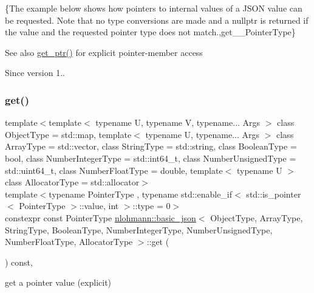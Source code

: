 \{The example below shows how pointers to internal values of a J\+S\+ON value can be requested. Note that no type conversions are made and a {\ttfamily nullptr} is returned if the value and the requested pointer type does not match.,get\+\_\+\+\_\+\+Pointer\+Type\}

\begin{DoxySeeAlso}{See also}
\hyperlink{classnlohmann_1_1basic__json_a7ab11375ed2e29c2fcb6119386851445}{get\+\_\+ptr()} for explicit pointer-\/member access
\end{DoxySeeAlso}
\begin{DoxySince}{Since}
version 1.. 
\end{DoxySince}
\hypertarget{classnlohmann_1_1basic__json_a9008c688b9bd5798e4090c971d20ee92}{}\label{classnlohmann_1_1basic__json_a9008c688b9bd5798e4090c971d20ee92} 
\subsubsection{\texorpdfstring{get()}{get()}\hspace{0.1cm}{\footnotesize\ttfamily [3/3]}}
{\footnotesize\ttfamily template$<$template$<$ typename U, typename V, typename... Args $>$ class Object\+Type = std\+::map, template$<$ typename U, typename... Args $>$ class Array\+Type = std\+::vector, class String\+Type  = std\+::string, class Boolean\+Type  = bool, class Number\+Integer\+Type  = std\+::int64\+\_\+t, class Number\+Unsigned\+Type  = std\+::uint64\+\_\+t, class Number\+Float\+Type  = double, template$<$ typename U $>$ class Allocator\+Type = std\+::allocator$>$ \\
template$<$typename Pointer\+Type , typename std\+::enable\+\_\+if$<$ std\+::is\+\_\+pointer$<$ Pointer\+Type $>$\+::value, int $>$\+::type  = 0$>$ \\
constexpr const Pointer\+Type \hyperlink{classnlohmann_1_1basic__json}{nlohmann\+::basic\+\_\+json}$<$ Object\+Type, Array\+Type, String\+Type, Boolean\+Type, Number\+Integer\+Type, Number\+Unsigned\+Type, Number\+Float\+Type, Allocator\+Type $>$\+::get (\begin{DoxyParamCaption}{ }\end{DoxyParamCaption}) const\hspace{0.3cm}{\ttfamily [inline]}, {\ttfamily [noexcept]}}



get a pointer value (explicit) 

